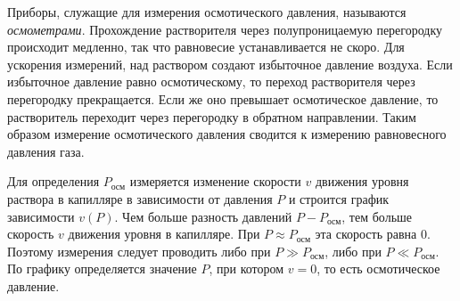 Приборы, служащие для измерения осмотического давления, называются \textit{осмометрами}. Прохождение растворителя через полупроницаемую перегородку происходит медленно, так что равновесие устанавливается не скоро. Для ускорения измерений, над раствором создают избыточное давление воздуха. Если избыточное давление равно осмотическому, то переход растворителя через перегородку прекращается. Если же оно превышает осмотическое давление, то растворитель переходит через перегородку в обратном направлении. Таким образом измерение осмотического давления сводится к измерению равновесного давления газа.

Для определения $P_{осм}$ измеряется изменение скорости $v$ движения уровня раствора в капилляре в зависимости от давления $P$ и строится график зависимости $v(P)$. Чем больше разность давлений $P - P_{осм}$, тем больше скорость $v$ движения уровня в капилляре. При $P \approx P_{осм}$ эта скорость равна 0. Поэтому измерения следует проводить либо при $P \gg P_{осм}$, либо при $P \ll P_{осм}$. По графику определяется значение $P$, при котором $v = 0$, то есть осмотическое давление.
